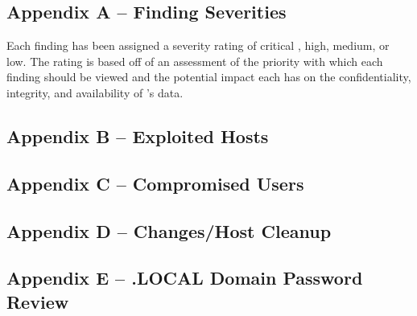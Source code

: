 \subsection{Appendix A – Finding Severities}
\qquad Each finding has been assigned a severity rating of critical , high, medium, or low. The rating is based off of an assessment of the
priority with which each finding should be viewed and the potential impact each has on the confidentiality, integrity, and
availability of \enterpriseName’s data.
\subsection{Appendix B – Exploited Hosts}
\subsection{Appendix C – Compromised Users}
\subsection{Appendix D – Changes/Host Cleanup}
\subsection{Appendix E – \enterpriseName.LOCAL Domain Password Review}